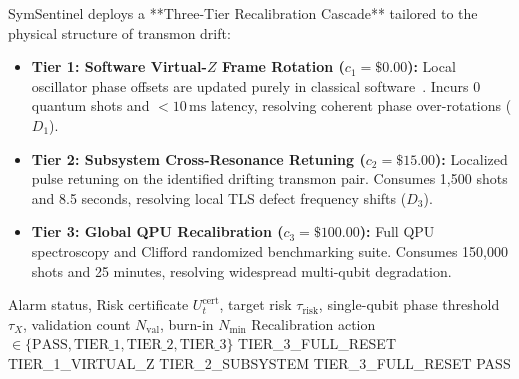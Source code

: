 \documentclass[aps,pra,twocolumn,superscriptaddress,10pt,floatfix]{revtex4-2}
\begin{document}
SymSentinel deploys a **Three-Tier Recalibration Cascade** tailored to the physical structure of transmon drift:
\begin{itemize}
    \item \textbf{Tier 1: Software Virtual-$Z$ Frame Rotation ($c_1 = \$0.00$):} Local oscillator phase offsets are updated purely in classical software~\cite{mckay2017efficient}. Incurs 0 quantum shots and $< 10\,\text{ms}$ latency, resolving coherent phase over-rotations ($D_1$).
    \item \textbf{Tier 2: Subsystem Cross-Resonance Retuning ($c_2 = \$15.00$):} Localized pulse retuning on the identified drifting transmon pair. Consumes 1,500 shots and 8.5 seconds, resolving local TLS defect frequency shifts ($D_3$).
    \item \textbf{Tier 3: Global QPU Recalibration ($c_3 = \$100.00$):} Full QPU spectroscopy and Clifford randomized benchmarking suite. Consumes 150,000 shots and 25 minutes, resolving widespread multi-qubit degradation.
\end{itemize}

\begin{algorithm}[t]
\caption{Three-Tier Cascade Recalibration Controller}
\label{alg:cascade}
\begin{algorithmic}[1]
\Require Alarm status, Risk certificate $U_t^{\mathrm{cert}}$, target risk $\tau_{\mathrm{risk}}$, single-qubit phase threshold $\tau_X$, validation count $N_{\mathrm{val}}$, burn-in $N_{\mathrm{min}}$
\Ensure Recalibration action $\in \{\text{PASS}, \text{TIER\_1}, \text{TIER\_2}, \text{TIER\_3}\}$
    \State \Return TIER\_3\_FULL\_RESET 
        \State \Return TIER\_1\_VIRTUAL\_Z 
        \State \Return TIER\_2\_SUBSYSTEM 
    \Else
        \State \Return TIER\_3\_FULL\_RESET 
    \EndIf
\Else
    \State \Return PASS 
\EndIf
\end{algorithmic}
\end{algorithm}
\end{document}
